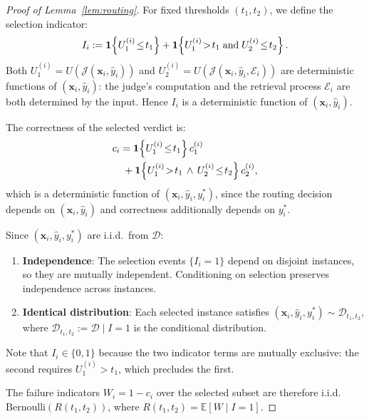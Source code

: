 \begin{proof}[Proof of Lemma~\ref{lem:routing}]
For fixed thresholds $(t_1, t_2)$, we define the selection indicator:
\begin{equation}
  I_i := \ind\!\left\{U_1^{(i)} \!\leq\! t_1\right\} + \ind\!\left\{U_1^{(i)} \!>\! t_1 \;\text{and}\; U_2^{(i)} \!\leq\! t_2\right\}.
\end{equation}
Both $U_1^{(i)} = U(\mathcal{J}(\mathbf{x}_i, \hat{y}_i))$ and $U_2^{(i)} = U(\mathcal{J}(\mathbf{x}_i, \hat{y}_i, \mathcal{E}_i))$ are deterministic functions of $(\mathbf{x}_i, \hat{y}_i)$: the judge's computation and the retrieval process $\mathcal{E}_i$ are both determined by the input. Hence $I_i$ is a deterministic function of $(\mathbf{x}_i, \hat{y}_i)$.

The correctness of the selected verdict is:
\begin{align}
  c_i &= \ind\!\left\{U_1^{(i)} \!\leq\! t_1\right\} c_1^{(i)} \nonumber \\
  &\;+ \ind\!\left\{U_1^{(i)} \!>\! t_1 \,\wedge\, U_2^{(i)} \!\leq\! t_2\right\} c_2^{(i)},
\end{align}
which is a deterministic function of $(\mathbf{x}_i, \hat{y}_i, y^*_i)$, since the routing decision depends on $(\mathbf{x}_i, \hat{y}_i)$ and correctness additionally depends on $y^*_i$.

Since $(\mathbf{x}_i, \hat{y}_i, y^*_i)$ are i.i.d.\ from $\mathcal{D}$:
\begin{enumerate}
  \item \textbf{Independence}: The selection events $\{I_i = 1\}$ depend on disjoint instances, so they are mutually independent. Conditioning on selection preserves independence across instances.
  \item \textbf{Identical distribution}: Each selected instance satisfies $(\mathbf{x}_i, \hat{y}_i, y^*_i) \sim \mathcal{D}_{t_1,t_2}$, where $\mathcal{D}_{t_1,t_2} := \mathcal{D} \mid I = 1$ is the conditional distribution.
\end{enumerate}
Note that $I_i \in \{0,1\}$ because the two indicator terms are mutually exclusive: the second requires $U_1^{(i)} > t_1$, which precludes the first.

The failure indicators $W_i = 1 - c_i$ over the selected subset are therefore i.i.d.\ $\mathrm{Bernoulli}(R(t_1, t_2))$, where $R(t_1, t_2) = \mathbb{E}[W \mid I = 1]$.
\end{proof}

